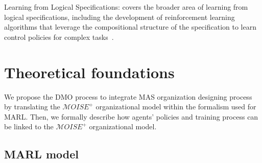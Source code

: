 \documentclass{ecai}
\begin{document}
Learning from Logical Specifications: covers the broader area of learning from logical specifications, including the development of reinforcement learning algorithms that leverage the compositional structure of the specification to learn control policies for complex tasks~\citep{Jothimurugan2021}.

\section{Theoretical foundations}





We propose the DMO process to integrate MAS organization designing process by translating the $\mathcal{M}OISE^{+}$ organizational model within the formalism used for MARL. Then, we formally describe how agents' policies and training process can be linked to the $\mathcal{M}OISE^{+}$ organizational model.

\subsection{MARL model}
\end{document}
